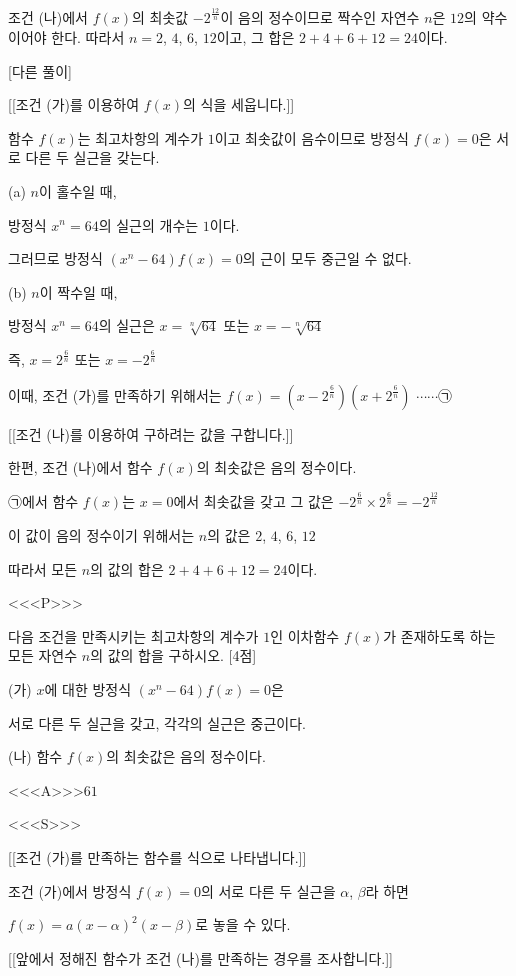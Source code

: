 \documentclass{oblivoir}
\begin{document}
조건 (나)에서 $f(x)$의 최솟값 $-2^{\frac{12}{n}}$이 음의 정수이므로 짝수인 자연수 $n$은 $12$의 약수이어야 한다. 따라서 $n=2$, $4$, $6$, $12$이고, 그 합은 $2+4+6+12 = 24$이다.

[다른 풀이]

[[조건 (가)를 이용하여 $f(x)$의 식을 세웁니다.]]

함수 $f(x)$는 최고차항의 계수가 $1$이고 최솟값이 음수이므로 방정식 $f(x)=0$은 서로 다른 두 실근을 갖는다.

(a) $n$이 홀수일 때,

방정식 $x^{n}=64$의 실근의 개수는 $1$이다.

그러므로 방정식 $(x^{n}-64)f(x)=0$의 근이 모두 중근일 수 없다.

(b) $n$이 짝수일 때,

방정식 $x^{n}=64$의 실근은 $x=\sqrt[n]{64}$ 또는 $x= -\sqrt[n]{64}$

즉, $x=2^{\frac{6}{n}}$ 또는 $x= -2^{\frac{6}{n}}$

이때, 조건 (가)를 만족하기 위해서는
$f(x)=\left(x-2^{\frac{6}{n}}\right)\left(x+2^{\frac{6}{n}}\right)$ $\cdots\cdots$㉠

[[조건 (나)를 이용하여 구하려는 값을 구합니다.]]

한편, 조건 (나)에서 함수 $f(x)$의 최솟값은 음의 정수이다.

㉠에서 함수 $f(x)$는 $x=0$에서 최솟값을 갖고 그 값은 $-2^{\frac{6}{n}}\times 2^{\frac{6}{n}}= -2^{\frac{12}{n}}$

이 값이 음의 정수이기 위해서는 $n$의 값은 $2$, $4$, $6$, $12$  

따라서 모든 $n$의 값의 합은 $2+4+6+12 = 24$이다.

<<<P>>>

다음 조건을 만족시키는 최고차항의 계수가 $1$인 이차함수 $f(x)$가 존재하도록 하는 모든 자연수 $n$의 값의 합을 구하시오. [4점]

(가) $x$에 대한 방정식 $(x^{n}-64)f(x)=0$은 

서로 다른 두 실근을 갖고, 각각의 실근은 중근이다. 

(나) 함수 $f(x)$의 최솟값은 음의 정수이다.

<<<A>>>$61$

<<<S>>>

[[조건 (가)를 만족하는 함수를 식으로 나타냅니다.]]

조건 (가)에서 방정식 $f(x)=0$의 서로 다른 두 실근을 $\alpha$, $\beta$라 하면

$f(x)=a(x-\alpha)^{2}(x-\beta)$로 놓을 수 있다.

[[앞에서 정해진 함수가 조건 (나)를 만족하는 경우를 조사합니다.]]
\end{document}
